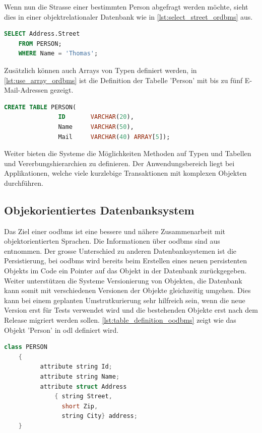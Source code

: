 Wenn nun die Strasse einer bestimmten Person abgefragt werden möchte, sieht dies in einer objektrelationaler Datenbank wie in \autoref{lst:select_street_ordbms} aus.

\begin{lstlisting}[language=SQL, caption=Abfrage in objektrelationalem Datenbanksystem, label=lst:select_street_ordbms]  
    SELECT Address.Street
    FROM PERSON;
    WHERE Name = 'Thomas';
\end{lstlisting}

Zusätzlich können auch Arrays von Typen definiert werden, in \autoref{lst:use_array_ordbms} ist die Definition der Tabelle 'Person' mit 
bis zu fünf E-Mail-Adressen gezeigt.

\begin{lstlisting}[language=SQL, caption=Verwendung von Array in objektrelationalem Datenbanksystem, label=lst:use_array_ordbms]  
    CREATE TABLE PERSON(
               ID       VARCHAR(20),
               Name     VARCHAR(50),
               Mail     VARCHAR(40) ARRAY[5]);
\end{lstlisting}

Weiter bieten die Systeme die Möglichkeiten Methoden auf Typen und Tabellen und Vererbungshierarchien zu definieren. Der Anwendungsbereich 
liegt bei Applikationen, welche viele kurzlebige Transaktionen mit komplexen Objekten durchführen.

\subsection{Objekorientiertes Datenbanksystem}\label{object_db}
Das Ziel einer \gls{oodbms} ist eine bessere und nähere Zusammenarbeit mit objektorientierten Sprachen.
Die Informationen über \gls{oodbms} sind aus \cite{limited2010introduction} entnommen. Der grosse Unterschied zu anderen Datenbanksystemen
ist die Persistierung, bei \gls{oodbms} wird bereits beim Erstellen eines neuen persistenten Objekts im Code ein Pointer auf das Objekt in der Datenbank zurückgegeben. 
Weiter unterstützen die Systeme Versionierung von Objekten, die Datenbank kann somit mit verschiedenen Versionen der Objekte gleichzeitig umgehen. 
Dies kann bei einem geplanten Umstrutkurierung sehr hilfreich sein, wenn die neue Version erst für Tests verwendet wird und die bestehenden Objekte erst nach dem 
Release migriert werden sollen. \autoref{lst:table_definition_oodbms} zeigt wie das Objekt 'Person' in \gls{odl} definiert wird.

\begin{lstlisting}[language=C++, caption=Objektdefinition in objektorientierem Datenbanksystem, label=lst:table_definition_oodbms]  
    class PERSON
    {
          attribute string Id;
          attribute string Name;
          attribute struct Address
              { string Street,
                short Zip,
                string City} address;
    }
\end{lstlisting}

